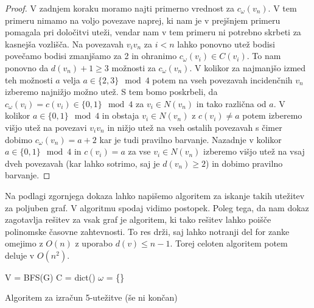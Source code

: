 \documentclass[12pt,a4paper,twoside]{article}
\theoremstyle{definition} %
\theoremstyle{plain} %
\numberwithin{equation}{section}  %
\begin{document}
\begin{proof}
V zadnjem koraku moramo najti primerno vrednost za $c_{\omega}(v_n)$. V tem primeru nimamo na voljo povezave naprej, ki nam je v prejšnjem primeru pomagala pri določitvi uteži, vendar nam v tem primeru ni potrebno skrbeti za kasnejša vozlišča. Na povezavah $v_iv_n$ za $i < n$ lahko ponovno utež bodisi povečamo bodisi zmanjšamo za 2 in ohranimo $c_{\omega}(v_i) \in C(v_i)$. To nam ponovno da $d(v_n) + 1 \ge 3$ možnosti za $c_{\omega}(v_n)$. V kolikor za najmanjšo izmed teh možnosti $a$ velja $a \in \{2,3\} \mod 4$ potem na vseh povezavah incidenčnih $v_n$ izberemo najnižjo možno utež. S tem bomo poskrbeli, da $c_{\omega}(v_i) = c(v_i) \in \{0,1\} \mod 4$ za $v_i \in N(v_n)$ in tako različna od $a$. V kolikor $a \in \{0,1\} \mod 4$ in obstaja $v_i \in N(v_n)$ z $c(v_i) \neq a$ potem izberemo višjo utež na povezavi $v_iv_n$ in nižjo utež na vseh ostalih povezavah s čimer dobimo $c_{\omega}(v_n) = a + 2$ kar je tudi pravilno barvanje. Nazadnje v kolikor $a \in \{0, 1\} \mod 4$ in $c(v_i) = a$ za vse $v_i \in N(v_n)$ izberemo višjo utež na vsaj dveh povezavah (kar lahko sotrimo, saj je $d(v_n) \ge 2$) in dobimo pravilno barvanje.
\end{proof}

Na podlagi zgornjega dokaza lahko napišemo algoritem za iskanje takih utežitev za poljuben graf. V  algoritmu spodaj vidimo postopek. Poleg tega, da nam dokaz zagotavlja rešitev za vsak graf je algoritem, ki tako rešitev lahko poišče polinomske časovne zahtevnosti. To res drži, saj lahko notranji del for zanke omejimo z $O(n)$ z uporabo $d(v) \le n-1 $. Torej celoten algoritem potem deluje v $O(n^2)$.
\begin{algorithm}[H]
 V = BFS(G)\;
C = dict() \;
 $\omega$ = \{\} \;
 
 \caption{Algoritem za izračun 5-utežitve (še ni končan)}
\end{algorithm}
\end{document}
